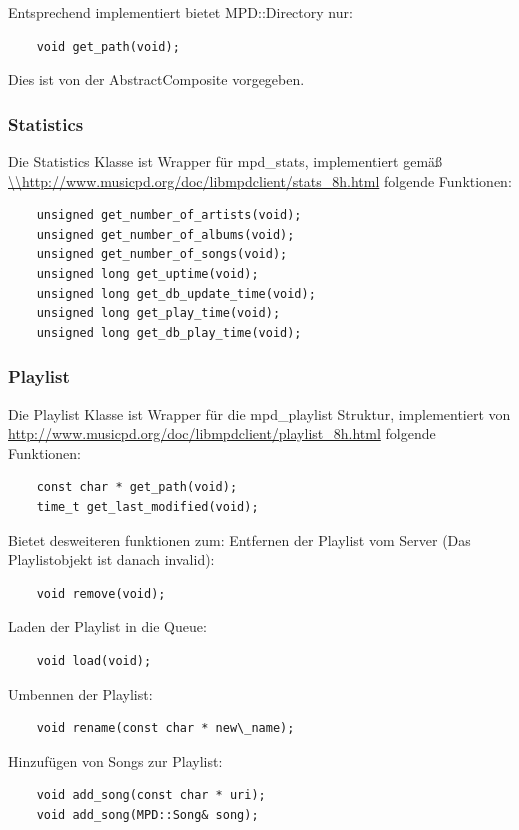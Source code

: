 Entsprechend implementiert bietet MPD::Directory nur:
\begin{verbatim}
    void get_path(void);
\end{verbatim}

Dies ist von der AbstractComposite vorgegeben.

\newpage
\subsubsection{Statistics}
Die Statistics Klasse ist Wrapper für mpd\_stats, implementiert gemäß \url{\\http://www.musicpd.org/doc/libmpdclient/stats\_8h.html}
folgende Funktionen:
\begin{verbatim}
    unsigned get_number_of_artists(void);
    unsigned get_number_of_albums(void);
    unsigned get_number_of_songs(void);
    unsigned long get_uptime(void);
    unsigned long get_db_update_time(void);
    unsigned long get_play_time(void);
    unsigned long get_db_play_time(void);
\end{verbatim}


\subsubsection{Playlist}
Die Playlist Klasse ist Wrapper für die mpd\_playlist Struktur, implementiert von \url{http://www.musicpd.org/doc/libmpdclient/playlist\_8h.html} folgende Funktionen:
\begin{verbatim}
    const char * get_path(void);
    time_t get_last_modified(void);
\end{verbatim}

Bietet desweiteren funktionen zum:
Entfernen der Playlist vom Server (Das Playlistobjekt ist danach invalid):
\begin{verbatim}
    void remove(void);
\end{verbatim}

Laden der Playlist in die Queue:
\begin{verbatim}
    void load(void);
\end{verbatim}

Umbennen der Playlist:
\begin{verbatim}
    void rename(const char * new\_name);
\end{verbatim}

Hinzufügen von Songs zur Playlist:
\begin{verbatim}
    void add_song(const char * uri);
    void add_song(MPD::Song& song);
\end{verbatim}

